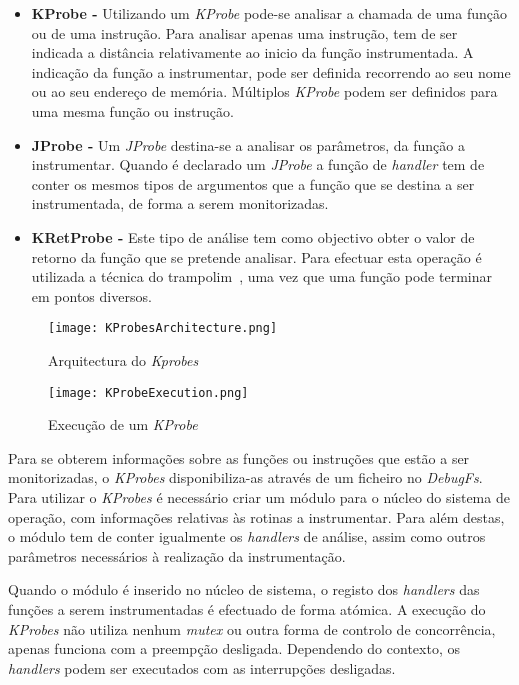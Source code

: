 \begin{itemize}
 \item \textbf{KProbe - } Utilizando um \textit{KProbe} pode-se analisar a chamada de uma função ou de uma instrução.
Para analisar apenas uma instrução, tem de ser indicada a distância relativamente ao inicio da função instrumentada.
A indicação da função a instrumentar, pode ser definida recorrendo ao seu nome ou ao seu endereço de memória.
Múltiplos \textit{KProbe} podem ser definidos para uma mesma função ou instrução.

\item \textbf{JProbe - } Um \textit{JProbe} destina-se a analisar os parâmetros, da função a instrumentar.
Quando é declarado um \textit{JProbe} a função de \textit{handler} tem de conter os mesmos tipos de argumentos que a função que se destina a ser instrumentada, de forma a serem monitorizadas.
 
 \item \textbf{KRetProbe - } Este tipo de análise tem como objectivo obter o valor de retorno da função que se pretende analisar.
Para efectuar esta operação é utilizada a técnica do trampolim~\cite{Hollingsworth94dynamicprogram}, uma vez que uma função pode terminar em pontos diversos.

\end{itemize}

\begin{figure}[!htb]
       \centering
       \texttt{[image: KProbesArchitecture.png]}
       \caption{Arquitectura do \textit{Kprobes} }
	\label{fig:kprobes_arch}
\end{figure}

\begin{figure}[!htb]
       \centering
       \texttt{[image: KProbeExecution.png]}
       \caption{Execução de um \textit{KProbe} }
	\label{fig:kprobe_execution}
\end{figure}

Para se obterem informações sobre as funções ou instruções que estão a ser monitorizadas, o \textit{KProbes} disponibiliza-as através de um ficheiro no \textit{DebugFs}.
Para utilizar o \textit{KProbes} é necessário criar um módulo para o núcleo do sistema de operação, com informações relativas às rotinas a instrumentar.
Para além destas, o módulo tem de conter igualmente os \textit{handlers} de análise, assim como outros parâmetros necessários à realização da instrumentação.

Quando o módulo é inserido no núcleo de sistema, o registo dos \textit{handlers} das funções a serem instrumentadas é efectuado de forma atómica.
A execução do \textit{KProbes} não utiliza nenhum \textit{mutex} ou outra forma de controlo de concorrência, apenas funciona com a preempção desligada.
Dependendo do contexto, os \textit{handlers} podem ser executados com as interrupções desligadas.

